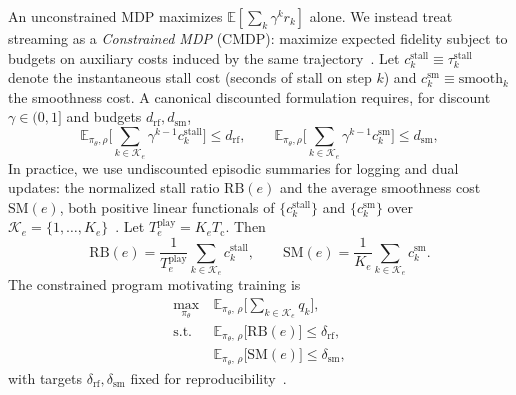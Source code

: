 \documentclass[preprint,12pt,times]{elsarticle}
\begin{document}
An unconstrained MDP maximizes \(\mathbb{E}[\sum_k \gamma^k r_k]\) alone.
We instead treat streaming as a \emph{Constrained MDP} (CMDP): maximize expected fidelity subject to budgets on auxiliary costs induced by the same trajectory~\cite{altman1999constrained}.
Let \(c^{\mathrm{stall}}_k \equiv \tau^{\mathrm{stall}}_k\) denote the instantaneous stall cost (seconds of stall on step \(k\)) and \(c^{\mathrm{sm}}_k \equiv \mathrm{smooth}_k\) the smoothness cost.
A canonical discounted formulation requires, for discount \(\gamma\in(0,1]\) and budgets \(d_{\mathrm{rf}},d_{\mathrm{sm}}\),
\begin{equation}
\label{eq:cmdp-disc}
    \mathbb{E}_{\pi_\theta,\rho}\Big[\sum_{k\in\mathcal{K}_e} \gamma^{k-1} c^{\mathrm{stall}}_k\Big] \le d_{\mathrm{rf}},
    \qquad
    \mathbb{E}_{\pi_\theta,\rho}\Big[\sum_{k\in\mathcal{K}_e} \gamma^{k-1} c^{\mathrm{sm}}_k\Big] \le d_{\mathrm{sm}},
\end{equation}
In practice, we use undiscounted episodic summaries for logging and dual updates: the normalized stall ratio \(\mathrm{RB}(e)\) and the average smoothness cost \(\mathrm{SM}(e)\), both positive linear functionals of \(\{c^{\mathrm{stall}}_k\}\) and \(\{c^{\mathrm{sm}}_k\}\) over \(\mathcal{K}_e=\{1,\ldots,K_e\}\)~\cite{mao2017neural,paternain2019dual}.
Let \(T^{\mathrm{play}}_{e}=K_{e}T_{\mathrm{c}}\). Then
\begin{equation}
    \mathrm{RB}(e)=\frac{1}{T^{\mathrm{play}}_{e}}\sum_{k\in\mathcal{K}_{e}} c^{\mathrm{stall}}_k,
    \qquad
    \mathrm{SM}(e)=\frac{1}{K_{e}}\sum_{k\in\mathcal{K}_{e}} c^{\mathrm{sm}}_k.
\end{equation}
The constrained program motivating training is
\begin{align}
\label{eq:prim}
    \max_{\pi_\theta} ~ & \mathbb{E}_{\pi_\theta,\,\rho}\Big[\sum_{k\in\mathcal{K}_{e}} q_k\Big],\\
\label{eq:c1}
    \mathrm{s.t.} ~~ & \mathbb{E}_{\pi_\theta,\,\rho}\Big[\mathrm{RB}(e)\Big] \le \delta_{\mathrm{rf}},\\
\label{eq:c2}
    & \mathbb{E}_{\pi_\theta,\,\rho}\Big[\mathrm{SM}(e)\Big] \le \delta_{\mathrm{sm}},
\end{align}
with targets \(\delta_{\mathrm{rf}},\delta_{\mathrm{sm}}\) fixed for reproducibility~\cite{yin2015control}.
\end{document}
